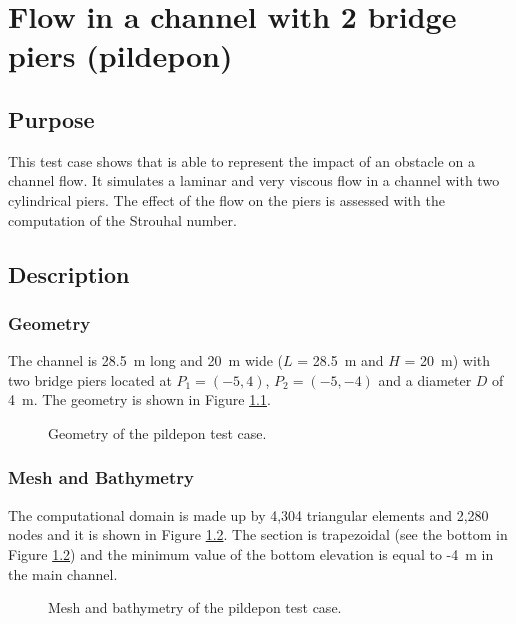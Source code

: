 \chapter{Flow in a channel with 2 bridge piers (pildepon)}

\section{Purpose}

This test case shows that  is able to represent the impact of an
obstacle on a channel flow.
It simulates a laminar and very viscous flow in a channel with two cylindrical piers.
The effect of the flow
on the piers is assessed with the computation of the Strouhal number.

\section{Description}

\subsection{Geometry}

The channel is 28.5~m long and 20~m wide ($L$ = 28.5~m and $H$ = 20~m) with two
bridge piers located at $P_1=(-5,4)$, $P_2=(-5,-4)$ and a diameter $D$ of 4~m.
The geometry is shown in Figure \ref{fig:geo:bridge}.

\begin{figure}[H]
 \centering
 \caption{Geometry of the pildepon test case.}
 \label{fig:geo:bridge}
\end{figure}

\subsection{Mesh and Bathymetry}

The computational domain is made up by 4,304 triangular elements and 2,280 nodes
and it is shown in Figure \ref{fig:mesh:bridge}.
The section is trapezoidal (see the bottom in Figure \ref{fig:mesh:bridge}) and
the minimum value of the bottom elevation is equal to -4~m in the main channel.

\begin{figure}[H]
\begin{minipage}[t]{0.45\textwidth}
 \centering
\end{minipage}
\begin{minipage}[t]{0.55\textwidth}
 \centering
\end{minipage}
 \caption{Mesh and bathymetry of the pildepon test case.}
 \label{fig:mesh:bridge}
\end{figure}

